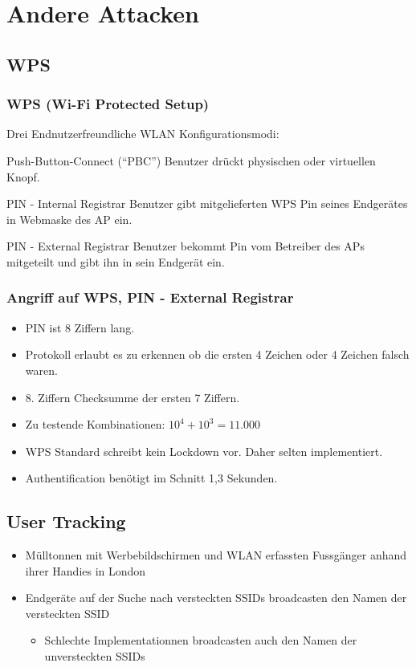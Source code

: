 \documentclass{beamer}
\begin{document}
\section{Andere Attacken}
\subsection{WPS}

\begin{frame}
\frametitle{WPS (Wi-Fi Protected Setup)}
Drei Endnutzerfreundliche WLAN Konfigurationsmodi:
\begin{block}{Push-Button-Connect (“PBC”)}
Benutzer drückt physischen oder virtuellen Knopf.
\end{block}
\begin{block}{PIN - Internal Registrar}
Benutzer gibt mitgelieferten WPS Pin seines Endgerätes in Webmaske des AP ein.
\end{block}
\begin{block}{PIN - External Registrar}
Benutzer bekommt Pin vom Betreiber des APs mitgeteilt und gibt ihn in sein Endgerät ein.
\end{block}
\end{frame}


\begin{frame}
\frametitle{Angriff auf WPS, PIN - External Registrar \cite{wps_attack}}
\begin{itemize}
	\item PIN ist 8 Ziffern lang.
	\item Protokoll erlaubt es zu erkennen ob die ersten 4 Zeichen oder 4 Zeichen falsch waren.
	\item 8. Ziffern Checksumme der ersten 7 Ziffern.
	\item Zu testende Kombinationen: $10^4+10^3 = 11.000$
	\item WPS Standard schreibt kein Lockdown vor. Daher selten implementiert.
	\item Authentification benötigt im Schnitt 1,3 Sekunden.
\end{itemize}
\end{frame}

\subsection{User Tracking}
\begin{frame}
\begin{itemize}
	\item Mülltonnen mit Werbebildschirmen und WLAN erfassten Fussgänger anhand ihrer Handies in London \cite{mulltonnen}
	\item Endgeräte auf der Suche nach versteckten SSIDs broadcasten den Namen der versteckten SSID
	\begin{itemize}
		\item Schlechte Implementationnen broadcasten auch den Namen der unversteckten SSIDs
	\end{itemize}
\end{itemize}
\end{frame}
\end{document}
